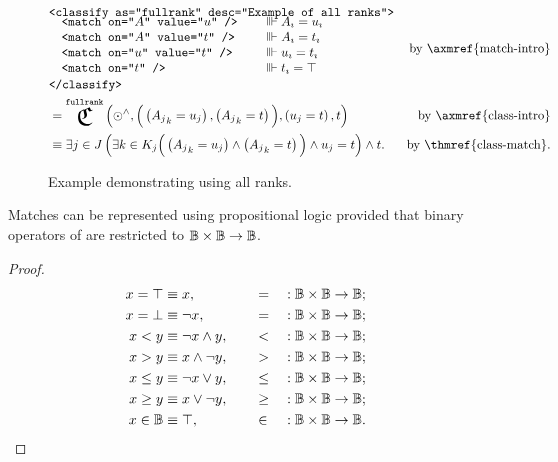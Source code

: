 \begin{figure}[ht]
\begin{align}
  &\begin{aligned}
    &\xml{<classify as="fullrank" desc="Example of all ranks">} \xmlnl
    &\quad\begin{aligned}
      &\xml{<match on="$A$" value="$u$" />}
        \quad&&\equivish \varsub A = \varsub u \xmlnll
      &\xml{<match on="$A$" value="$t$" />}
        \quad&&\equivish \varsub A = \varsub t \xmlnll
      &\xml{<match on="$u$" value="$t$" />}
        \quad&&\equivish \varsub u = \varsub t \xmlnll
      &\xml{<match on="$t$" />}
        \quad&&\equivish \varsub t = \true
    \end{aligned} \xmlnll
    &\xml{</classify>}
  \end{aligned}
    &\text{by \axmref{match-intro}} \\
  &= \Classify^\texttt{fullrank}\left(
       \odot^\land,
       \Big(\left({A_j}_k = u_j\right),
             \left({A_j}_k = t \right)
       \Big),
       \left(u_j = t\right),
       t
     \right)
    &\text{by \axmref{class-intro}} \\
  &\equiv \Exists{j\in J}{
            \Exists*{k\in K_j}{\Big(
              \left({A_j}_k = u_j\right)
              \land \left({A_j}_k = t \right)
            \Big)}
            \land u_j = t
          }
          \land t.
    &\text{by \thmref{class-match}}.
\end{align}
\caption{Example demonstrating  using all ranks.}
\label{f:ex:class-match-all-ranks}
\end{figure}

\begin{lemma}
  Matches can be represented using propositional logic provided that
    binary operators of  are restricted to $\mathbb{B}\times\mathbb{B}\rightarrow\mathbb{B}$.
\end{lemma}
\begin{proof}
  \begin{alignat*}{4}
    x = \top  &\equiv x,               &&\quad=    &&: \mathbb{B}\times\mathbb{B}\rightarrow\mathbb{B}; \\
    x = \bot &\equiv \neg x,          &&\quad=    &&: \mathbb{B}\times\mathbb{B}\rightarrow\mathbb{B}; \\
    x < y      &\equiv \neg x \land y,  &&\quad<    &&: \mathbb{B}\times\mathbb{B}\rightarrow\mathbb{B}; \\
    x > y      &\equiv x \land \neg y,  &&\quad>    &&: \mathbb{B}\times\mathbb{B}\rightarrow\mathbb{B}; \\
    x \leq y   &\equiv \neg x \lor y,   &&\quad\leq &&: \mathbb{B}\times\mathbb{B}\rightarrow\mathbb{B}; \\
    x \geq y   &\equiv x \lor \neg y,   &&\quad\geq &&: \mathbb{B}\times\mathbb{B}\rightarrow\mathbb{B}; \\
    x \in\mathbb{B} &\equiv \top,           &&\quad\in  &&: \mathbb{B}\times\mathbb{B}\rightarrow\mathbb{B}.\tag*{\qedhere}
  \end{alignat*}
\end{proof}

